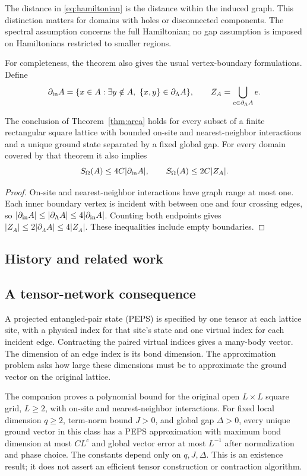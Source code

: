 The distance in \eqref{eq:hamiltonian} is the distance within the induced
graph. This distinction matters for domains with holes or disconnected
components. The spectral assumption concerns the full Hamiltonian; no gap
assumption is imposed on Hamiltonians restricted to smaller regions.

For completeness, the theorem also gives the usual vertex-boundary
formulations. Define
\[
 \partial_{\rm in}A=\{x\in A:\exists y\notin A,
                \ \{x,y\}\in\partial_\Lambda A\},
 \qquad
 Z_A=\bigcup_{e\in\partial_\Lambda A}e.
\]

\begin{corollary}\label{cor:rectangles}
The conclusion of Theorem~\ref{thm:area} holds for every subset of a finite
rectangular square lattice with bounded on-site and nearest-neighbor
interactions and a unique ground state separated by a fixed global gap.
For every domain covered by that theorem it also implies
\[
 S_\Omega(A)\le4C|\partial_{\rm in}A|,
 \qquad S_\Omega(A)\le2C|Z_A|.
\]
\end{corollary}
\begin{proof}
On-site and nearest-neighbor interactions have graph range at most one.
Each inner boundary vertex is incident with between one and four crossing
edges, so $|\partial_{\rm in}A|\le|\partial_\Lambda A|
\le4|\partial_{\rm in}A|$. Counting both endpoints gives
$|Z_A|\le2|\partial_\Lambda A|\le4|Z_A|$.
These inequalities include empty boundaries.
\end{proof}

\subsection{History and related work}


\subsection{A tensor-network consequence}

A projected entangled-pair state (PEPS) is specified by one tensor at each
lattice site, with a physical index for that site's state and one virtual
index for each incident edge. Contracting the paired virtual indices gives
a many-body vector. The dimension of an edge index is its bond dimension.
The approximation problem asks how large these dimensions must be to
approximate the ground vector on the original lattice.

The companion \cite[Theorem~1.1]{OpenAI2026PolynomialPEPS} proves a
polynomial bound for the original open $L\times L$ square grid, $L\ge2$,
with on-site and nearest-neighbor interactions. For fixed local dimension
$q\ge2$, term-norm bound $J>0$, and global gap $\Delta>0$, every unique
ground vector in this class has a PEPS approximation with maximum bond
dimension at most $CL^c$ and global vector error at most $L^{-1}$ after
normalization and phase choice. The constants depend only on $q,J,\Delta$.
This is an existence result; it does not assert an efficient tensor
construction or contraction algorithm.

